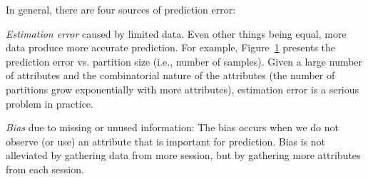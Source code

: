 \label{subsec:challenges}

In general, there are four sources of prediction error:

\begin{packedenumerate}
\item \emph{Estimation error} caused by limited data.  Even other
  things being equal, more data produce more accurate prediction. For
  example, Figure~\ref{fig:group-size-impact} presents the prediction
  error vs. partition size (i.e., number of samples). Given a large number
  of attributes and the combinatorial nature of the attributes (the
  number of partitions grow exponentially with more attributes),
  estimation error is a serious problem in practice.


\begin{figure}[h!]
\centering
{}
\label{fig:group-size-impact}
\end{figure}

\item \emph{Bias} due to missing or unused information: The bias
  occurs when we do not observe (or use) an attribute that is
  important for prediction. Bias is not alleviated by gathering data
  from more session, but by gathering more attributes from each
  session.


\end{packedenumerate}
